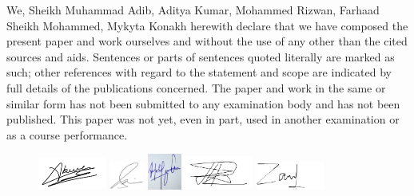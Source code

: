 \documentclass[conference]{IEEEtran}
\begin{document}
We, Sheikh Muhammad Adib, Aditya Kumar, Mohammed Rizwan, Farhaad Sheikh Mohammed, Mykyta Konakh herewith declare that we have composed the present paper and work ourselves and without the use of any other than the cited sources and aids. Sentences or parts of sentences quoted literally are marked as such; other references with regard to the statement and scope are indicated by full details of the publications concerned. The paper and work in the same or similar form has not been submitted to any examination body and has not been published. This paper was not yet, even in part, used in another examination or as a course performance.
\begin{figure}[ht]
    \includegraphics[width=0.2\textwidth]{images/Aditya_signature.png}
    \includegraphics[width=0.1\textwidth]{images/sheikh_signature.png}
    \includegraphics[width=0.1\textwidth]{images/Rizwan_sign.jpeg}
    \includegraphics[width=0.2\textwidth]{images/mykyta_signature.png}
    \includegraphics[width=0.2\textwidth]{images/Farhaad_signature.png}
\end{figure}
\end{document}
